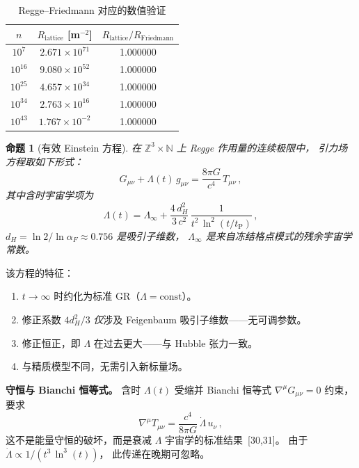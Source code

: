\documentclass[a4paper,11pt]{article}
\theoremstyle{plain}
\newtheorem{proposition}{命题}
\newcommand{\lnq}{\ln^2}
\newcommand{\tP}{t_{\mathrm{P}}}
\newcommand{\ZZ}{\mathbb{Z}}
\newcommand{\NN}{\mathbb{N}}
\begin{document}
\begin{table}[h]
\centering
\caption{Regge--Friedmann 对应的数值验证}
\label{tab:regge}
\begin{tabular}{ccc}
\toprule
$n$ & $R_{\mathrm{lattice}}$ [m$^{-2}$] & $R_{\mathrm{lattice}}/R_{\mathrm{Friedmann}}$ \\
\midrule
$10^{7}$  & $2.671\times10^{71}$  & 1.000000 \\
$10^{16}$ & $9.080\times10^{52}$  & 1.000000 \\
$10^{25}$ & $4.657\times10^{34}$  & 1.000000 \\
$10^{34}$ & $2.763\times10^{16}$  & 1.000000 \\
$10^{43}$ & $1.767\times10^{-2}$  & 1.000000 \\
\bottomrule
\end{tabular}
\end{table}

\begin{proposition}[有效 Einstein 方程]\label{prop:einstein}
在 $\ZZ^3 \times \NN$ 上 Regge 作用量的连续极限中，
引力场方程取如下形式：
\begin{equation}
  \boxed{G_{\mu\nu} + \Lambda(t)\,g_{\mu\nu}
  = \frac{8\pi G}{c^4}\,T_{\mu\nu}\,,}
\end{equation}
其中含时宇宙学项为
\begin{equation}
  \Lambda(t) = \Lambda_\infty
  + \frac{4\,d_H^2}{3\,c^2}\,\frac{1}{t^2\,\lnq(t/\tP)}\,,
\end{equation}
$d_H = \ln 2/\ln\alpha_F \approx 0.756$ 是吸引子维数，
$\Lambda_\infty$ 是来自冻结格点模式的残余宇宙学常数。
\end{proposition}

该方程的特征：
\begin{enumerate}
  \item $t \to \infty$ 时约化为标准 GR（$\Lambda = \mathrm{const}$）。
  \item 修正系数 $4d_H^2/3$ \emph{仅}涉及 Feigenbaum 吸引子维数——无可调参数。
  \item 修正恒正，即 $\Lambda$ 在过去更大——与 Hubble 张力一致。
  \item 与精质模型不同，无需引入新标量场。
\end{enumerate}

\textbf{守恒与 Bianchi 恒等式。}
含时 $\Lambda(t)$ 受缩并 Bianchi 恒等式 $\nabla^\mu G_{\mu\nu} = 0$ 约束，要求
\begin{equation}
  \nabla^\mu T_{\mu\nu} = \frac{c^4}{8\pi G}\,\dot\Lambda\,u_\nu\,,
\end{equation}
这不是能量守恒的破坏，而是衰减 $\Lambda$ 宇宙学的标准结果~[30,31]。
由于 $\dot\Lambda \propto 1/(t^3\,\ln^3(t))$，
此传递在晚期可忽略。
\end{document}
